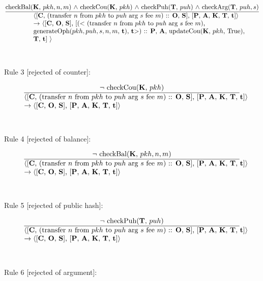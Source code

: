 \documentclass[a4paper]{llncs}
\begin{document}
\begin{equation}{}
\frac{\text{checkBal(\MANAGERS, $pkh, n, m$) $\wedge$ checkCou(\MANAGERS, $pkh$) $\wedge$ checkPuh(\CONTRACTORS, $puh$)}
\\
\text{ $\wedge$ checkArg(\CONTRACTORS, $puh, s$)}}{\parbox{4.2in}{\text{$\langle$[\ACCOUNTS, (transfer ${n}$ from ${pkh}$ to  ${puh}$ arg ${s}$ fee ${m}$) :: \OPERATIONS, \CONTRACTS], [\PENDING, \ACCEPTED, \MANAGERS, \CONTRACTORS, \TIME]$\rangle$}\\
\text{$\rightarrow$  $\langle$[\ACCOUNTS, \OPERATIONS, \CONTRACTS], [($<$ (transfer ${n}$ from ${pkh}$ to  ${puh}$ arg ${s}$ fee ${m}$), }\\
 \text{generateOph($pkh, puh, s, n, m$, \TIME), \TIME $>$) :: \PENDING, \ACCEPTED, updateCou(\MANAGERS, $pkh$, True), }\\
\text{\CONTRACTORS, \TIME] $\rangle$}}} 
\end{equation}
~\\
~\\
Rule 3 [rejected of counter]:

\begin{equation}{}
\frac{\text{$\neg$ checkCou(\MANAGERS, $pkh$)}}{\parbox{4.2in}{\text{$\langle$[\ACCOUNTS, (transfer ${n}$ from ${pkh}$ to  ${puh}$ arg ${s}$ fee ${m}$) :: \OPERATIONS, \CONTRACTS], [\PENDING, \ACCEPTED, \MANAGERS, \CONTRACTORS, \TIME]$\rangle$  }\\
\text{$\rightarrow \langle$[\ACCOUNTS, \OPERATIONS, \CONTRACTS], [\PENDING, \ACCEPTED, \MANAGERS, \CONTRACTORS, \TIME]$\rangle$}}} 
\end{equation}
~\\
~\\
Rule 4 [rejected of balance]:

\begin{equation}{}
\frac{\text{$\neg$ checkBal(\MANAGERS, $pkh, n, m$)}}{\parbox{4.2in}{\text{$\langle$[\ACCOUNTS, (transfer ${n}$ from ${pkh}$ to  ${puh}$ arg ${s}$ fee ${m}$) :: \OPERATIONS, \CONTRACTS], [\PENDING, \ACCEPTED, \MANAGERS, \CONTRACTORS, \TIME]$\rangle$ }\\
\text{$\rightarrow \langle$[\ACCOUNTS, \OPERATIONS, \CONTRACTS], [\PENDING, \ACCEPTED, \MANAGERS, \CONTRACTORS, \TIME]$\rangle$}}} 
\end{equation}
~\\
~\\
Rule 5 [rejected of public hash]:

\begin{equation}{}
\frac{\text{$\neg$ checkPuh(\CONTRACTORS, $puh$)}}{\parbox{4.2in}{\text{$\langle$[\ACCOUNTS, (transfer ${n}$ from ${pkh}$ to  ${puh}$ arg ${s}$ fee ${m}$) :: \OPERATIONS, \CONTRACTS], [\PENDING, \ACCEPTED, \MANAGERS, \CONTRACTORS, \TIME]$\rangle$ }\\
\text{$\rightarrow \langle$[\ACCOUNTS, \OPERATIONS, \CONTRACTS], [\PENDING, \ACCEPTED, \MANAGERS, \CONTRACTORS, \TIME]$\rangle$}}} 
\end{equation}
~\\
~\\
Rule 6 [rejected of argument]:
\end{document}
